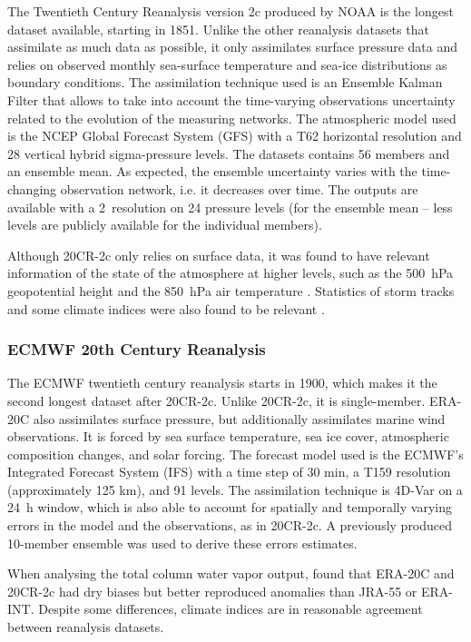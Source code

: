 \documentclass{ametsoc}
\begin{document}
The Twentieth Century Reanalysis version 2c \citep[20CR-2c, ][]{Compo2011} produced by NOAA is the longest dataset available, starting in 1851. Unlike the other reanalysis datasets that assimilate as much data as possible, it only assimilates surface pressure data and relies on observed monthly sea-surface temperature and sea-ice distributions as boundary conditions. The assimilation technique used is an Ensemble Kalman Filter that allows to take into account the time-varying observations uncertainty related to the evolution of the measuring networks. The atmospheric model used is the NCEP Global Forecast System (GFS) with a T62 horizontal resolution and 28 vertical hybrid sigma-pressure levels. The datasets contains 56 members and an ensemble mean. As expected, the ensemble uncertainty varies with the time-changing observation network, i.e. it decreases over time. The outputs are available with a 2\degree\ resolution on 24 pressure levels (for the ensemble mean -- less levels are publicly available for the individual members).

Although 20CR-2c only relies on surface data, it was found to have relevant information of the state of the atmosphere at higher levels, such as the 500~hPa geopotential height and the 850~hPa air temperature \citep{Compo2011}. Statistics of storm tracks and some climate indices were also found to be relevant \citep{Compo2011}.


\subsubsection{ECMWF 20th Century Reanalysis}

The ECMWF twentieth century reanalysis \citep[ERA-20C, ][]{Poli2016} starts in 1900, which makes it the second longest dataset after 20CR-2c. Unlike 20CR-2c, it is single-member. ERA-20C also assimilates surface pressure, but additionally assimilates marine wind observations. It is forced by sea surface temperature, sea ice cover, atmospheric composition changes, and solar forcing. The forecast model used is the ECMWF’s Integrated Forecast System (IFS) with a time step of 30 min, a T159 resolution (approximately 125 km), and 91 levels. The assimilation technique is 4D-Var on a 24~h window, which is also able to account for spatially and temporally varying errors in the model and the observations, as in 20CR-2c. A previously produced 10-member ensemble was used to derive these errors estimates.

When analysing the total column water vapor output, \citet{Poli2016} found that ERA-20C and 20CR-2c had dry biases but better reproduced anomalies than JRA-55 or ERA-INT. Despite some differences, climate indices are in reasonable agreement between reanalysis datasets.
\end{document}
